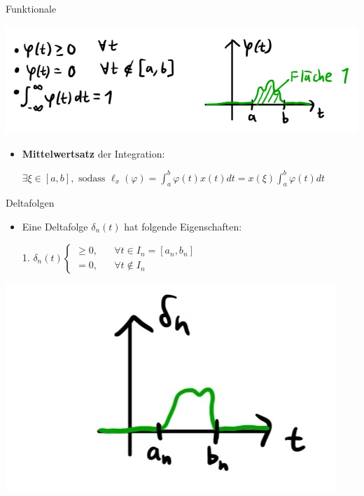 \documentclass[14pt, aspectratio=169, handout]{beamer}
\begin{document}
\begin{frame}{Funktionale}
    \begin{center}
        \includegraphics[width=0.8\linewidth]{figures/Funktionale_3.jpg}
    \end{center}
    \begin{itemize}
        \item \textbf{Mittelwertsatz} der Integration: 
        \item[] $\exists \xi \in [a,b], \text{ sodass }  \ell_x(\varphi) = \displaystyle\int_a^b \varphi(t)x(t)dt = x(\xi)\displaystyle\int_a^b \varphi(t)dt$
    \end{itemize}
\end{frame}

\begin{frame}{Deltafolgen}
    \begin{itemize}
        \item Eine Deltafolge $\delta_n(t)$ hat folgende Eigenschaften:
        \item[] 
        \item[1.]  $\delta_n(t) \begin{cases}
        \geq 0, \hspace{20pt} \forall t \in I_n = [a_n, b_n]\\
        = 0, \hspace{20pt} \forall t \notin I_n
        \end{cases}$
    \end{itemize}
    \begin{center}
        \includegraphics[width=0.4\linewidth]{figures/Deltafolge_3.jpg}
    \end{center}
\end{frame}
\end{document}
